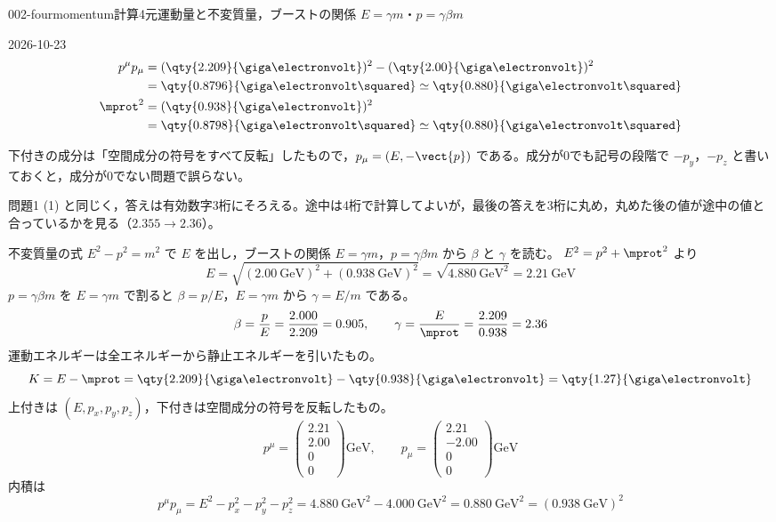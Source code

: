 \documentclass[uplatex,dvipdfmx,a4paper,11pt]{jsarticle}
\begin{document}
\begin{mondai}{002-fourmomentum}{計算}{4元運動量と不変質量，ブーストの関係 $E=\gamma m$・$p=\gamma\beta m$}
\begin{kotaeutsushi}{2026-10-23}
\begin{align*}
  p^{\mu}p_{\mu}&=(\qty{2.209}{\giga\electronvolt})^{2}-(\qty{2.00}{\giga\electronvolt})^{2}\\
  &=\qty{0.8796}{\giga\electronvolt\squared}\simeq\qty{0.880}{\giga\electronvolt\squared}\\
  \mprot^{2}&=(\qty{0.938}{\giga\electronvolt})^{2}\\
  &=\qty{0.8798}{\giga\electronvolt\squared}\simeq\qty{0.880}{\giga\electronvolt\squared}
\end{align*}
\end{kotaeutsushi}
\begin{kizuki}
\item 下付きの成分は「空間成分の符号をすべて反転」したもので，$p_{\mu}=(E,-\vect{p})$ である。成分が0でも記号の段階で $-p_{y}$，$-p_{z}$ と書いておくと，成分が0でない問題で誤らない。
\item 問題1 (1) と同じく，答えは有効数字3桁にそろえる。途中は4桁で計算してよいが，最後の答えを3桁に丸め，丸めた後の値が途中の値と合っているかを見る（$2.355\to2.36$）。
\end{kizuki}
\begin{tadashii}
\houshin 不変質量の式 $E^2-p^2=m^2$ で $E$ を出し，ブーストの関係 $E=\gamma m$，$p=\gamma\beta m$ から $\beta$ と $\gamma$ を読む。
\keisan {} $E^2=p^2+\mprot^2$ より
\[ E=\sqrt{(\qty{2.00}{\giga\electronvolt})^2+(\qty{0.938}{\giga\electronvolt})^2}=\sqrt{\qty{4.880}{\giga\electronvolt\squared}}=\qty{2.21}{\giga\electronvolt} \]
 $p=\gamma\beta m$ を $E=\gamma m$ で割ると $\beta=p/E$，$E=\gamma m$ から $\gamma=E/m$ である。
\[ \beta=\frac{p}{E}=\frac{2.000}{2.209}=0.905,\qquad \gamma=\frac{E}{\mprot}=\frac{2.209}{0.938}=2.36 \]
 運動エネルギーは全エネルギーから静止エネルギーを引いたもの。
\[ K=E-\mprot=\qty{2.209}{\giga\electronvolt}-\qty{0.938}{\giga\electronvolt}=\qty{1.27}{\giga\electronvolt} \]
 上付きは $(E,p_x,p_y,p_z)$，下付きは空間成分の符号を反転したもの。
\[ p^\mu=\begin{pmatrix}2.21\\2.00\\0\\0\end{pmatrix}\unit{\giga\electronvolt},\qquad p_\mu=\begin{pmatrix}2.21\\-2.00\\0\\0\end{pmatrix}\unit{\giga\electronvolt} \]
内積は
\[ p^\mu p_\mu=E^2-p_x^2-p_y^2-p_z^2=\qty{4.880}{\giga\electronvolt\squared}-\qty{4.000}{\giga\electronvolt\squared}=\qty{0.880}{\giga\electronvolt\squared}=(\qty{0.938}{\giga\electronvolt})^2 \]

\end{tadashii}
\end{mondai}
\end{document}
